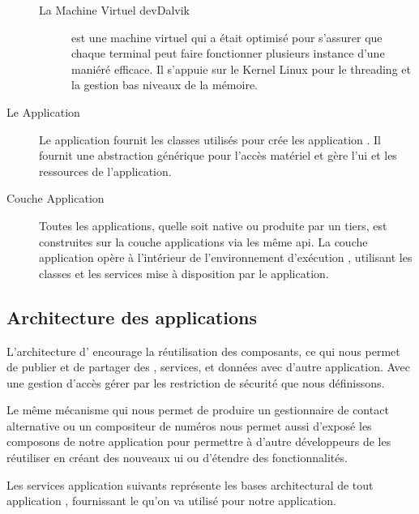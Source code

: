 \begin{description}
\begin{description}
\item [La Machine Virtuel dev{Dalvik}]

 est une machine virtuel qui a était optimisé pour s'assurer que
chaque terminal peut faire fonctionner plusieurs instance d'une maniéré
efficace. Il s’appuie sur le Kernel Linux pour le threading et la gestion bas
niveaux de la mémoire.

\end{description}

\item [Le \en{Framework} Application]

Le  application fournit les classes utilisés pour crée les application \android{}. Il fournit une abstraction générique pour l’accès matériel et gère l'\gls{ui} et les ressources de l'application.

\item [Couche Application]

Toutes les applications, quelle soit native ou produite par un tiers, est
construites sur la couche applications via les même \gls{api}. La couche
application opère à l'intérieur de l'environnement d’exécution \android{},
utilisant les classes et les services mise à disposition par le 
application.

\end{description}

\subsection[Architecture des applications \android{}]{Architecture des applications \android{}\cite{pa4ad:chptr1}}

L'architecture d'\android{} encourage la réutilisation des composants, ce qui nous permet de publier et de partager des , services, et données avec d'autre application. Avec une gestion d’accès gérer par les restriction de sécurité que nous définissons.

Le même mécanisme qui nous permet de produire un gestionnaire de contact alternative ou un compositeur de numéros nous permet aussi d'exposé les composons de notre application pour permettre à d'autre développeurs de les réutiliser en créant des nouveaux \gls{ui} ou d’étendre des fonctionnalités.

Les services application suivants représente les bases architectural de tout application \android{}, fournissant le  qu'on va utilisé pour notre application.

